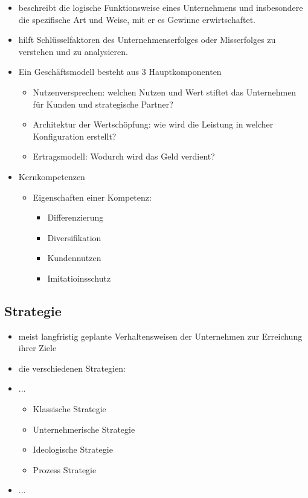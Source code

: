 \begin{itemize}
        \item beschreibt die logische Funktionsweise eines Unternehmens und insbesondere die spezifische Art und Weise, mit er es Gewinne erwirtschaftet.

        \item hilft Schlüsselfaktoren des Unternehmenserfolges oder Misserfolges zu verstehen und zu analysieren.

    \item Ein Geschäftsmodell besteht aus 3 Hauptkomponenten
    \begin{itemize}
        \item Nutzenversprechen: welchen Nutzen und Wert stiftet das Unternehmen für Kunden und strategische Partner?
        \item Architektur der Wertschöpfung: wie wird die Leistung in welcher Konfiguration erstellt?
        \item Ertragsmodell: Wodurch wird das Geld verdient?
    \end{itemize}


    \item Kernkompetenzen
    \begin{itemize}
        \item Eigenschaften einer Kompetenz:

        \begin{itemize}
            \item Differenzierung
            \item Diversifikation
            \item Kundennutzen
            \item Imitatioinsschutz
        \end{itemize}
    \end{itemize}


\end{itemize}



\subsection{Strategie}


\begin{itemize}
    \item meist langfristig geplante Verhaltensweisen der Unternehmen zur Erreichung ihrer Ziele
        \item die verschiedenen Strategien:
    \item ...
    \begin{itemize}
        \item Klassische Strategie
        \item Unternehmerische Strategie
        \item Ideologische Strategie
        \item Prozess Strategie
        \end{itemize}

    \item ...

\end{itemize}


